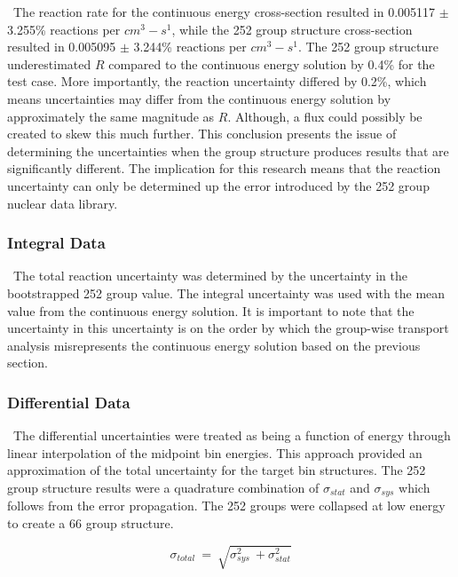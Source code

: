 \ The reaction rate for the continuous energy cross-section resulted in 0.005117 $\pm$ 3.255\% reactions per  $cm^{3}-s^{1}$, while the 252 group structure cross-section resulted in 0.005095 $\pm$ 3.244\% reactions per  $cm^{3}-s^{1}$. The 252 group structure underestimated $R$ compared to the continuous energy solution by 0.4\% for the test case.  
More importantly, the reaction uncertainty differed by 0.2\%, which means uncertainties may differ from the continuous energy solution by approximately the same magnitude as $R$. Although, a flux could possibly be created to skew this much further. 
This conclusion presents the issue of determining the uncertainties when the group structure produces results that are significantly different. 
The implication for this research means that the reaction uncertainty can only be determined up the error introduced by the 252 group nuclear data library. 
\subsubsection{Integral Data}

\ The total reaction uncertainty was determined by the uncertainty in the bootstrapped 252 group value. 
The integral uncertainty was used with the mean value from the continuous energy solution. 
It is important to note that the uncertainty in this uncertainty is on the order by which the group-wise transport analysis misrepresents the continuous energy solution based on the previous section. 

\subsubsection{Differential Data}
\ The differential uncertainties were treated as being a function of energy through linear interpolation of the midpoint bin energies. 
This approach provided an approximation of the total uncertainty for the target bin structures. 
The 252 group structure results were a quadrature combination of $\sigma_{stat}$ and  $\sigma_{sys}$ which follows from the error propagation. 
The 252 groups were collapsed at low energy to create a 66 group structure.  

\begin{equation} \label{eq:uncertainty}
\sigma_{total}  \ = \ \sqrt{\sigma_{sys}^{2} \ + \sigma_{stat}^{2}}
\end{equation} 

